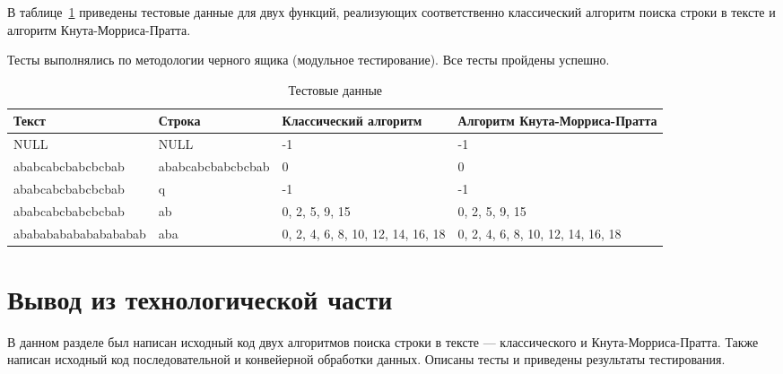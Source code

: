 В таблице~\ref{tabular:testsdata} приведены тестовые данные для двух функций, реализующих соответственно классический алгоритм поиска строки в тексте и алгоритм Кнута-Морриса-Пратта. 

Тесты выполнялись по методологии черного ящика (модульное тестирование). Все тесты пройдены успешно.

\begin{table}[H]
\caption{Тестовые данные}
\label{tabular:testsdata}
\begin{tabular}{|p{4.5cm}|p{4cm}|p{3.5cm}|p{3.5cm}|}
\hline
\textbf{Текст} & \textbf{Строка} & \textbf{Классический алгоритм} & \textbf{Алгоритм Кнута-Морриса-Пратта}
\tabularnewline
\hline
NULL & NULL & -1 & -1
\tabularnewline
\hline
ababcabcbabcbcbab & ababcabcbabcbcbab & 0 & 0
\tabularnewline
\hline
ababcabcbabcbcbab & q & -1 & -1
\tabularnewline
\hline
ababcabcbabcbcbab & ab & 0, 2, 5, 9, 15 & 0, 2, 5, 9, 15
\tabularnewline
\hline
abababababa\-babababab & aba & 0, 2, 4, 6, 8, 10, 12, 14, 16, 18 & 0, 2, 4, 6, 8, 10, 12, 14, 16, 18
\tabularnewline
\hline
\end{tabular}
\end{table}

\section*{Вывод из технологической части}

В данном разделе был написан исходный код двух алгоритмов поиска строки в тексте --- классического и Кнута-Морриса-Пратта. 
Также написан исходный код последовательной и конвейерной обработки данных. 
Описаны тесты и приведены результаты тестирования.
